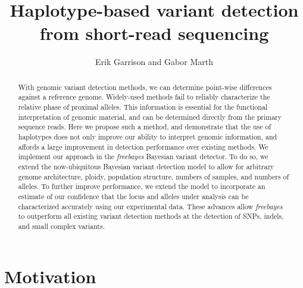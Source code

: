 \documentclass{article}
\begin{document}
\large

\title{Haplotype-based variant detection from short-read sequencing}

\author{Erik Garrison and Gabor Marth}

\maketitle


\begin{abstract}

With genomic variant detection methods, we can determine point-wise differences against a reference genome.  Widely-used methods fail to reliably characterize the relative phase of proximal alleles.  This information is essential for the functional interpretation of genomic material, and can be determined directly from the primary sequence reads.  Here we propose such a method, and demonstrate that the use of haplotypes does not only improve our ability to interpret genomic information, and affords a large improvement in detection performance over existing methods.  We implement our approach in the \emph{freebayes} Bayesian variant detector.  To do so, we extend the now-ubiquitous Bayesian variant detection model to allow for arbitrary genome architecture, ploidy, population structure, numbers of samples, and numbers of alleles.  To further improve performance, we extend the model to incorporate an estimate of our confidence that the locus and alleles under analysis can be characterized accurately using our experimental data.  These advances allow \emph{freebayes} to outperform all existing variant detection methods at the detection of SNPs, indels, and small complex variants.


\end{abstract}



\section{Motivation}
\end{document}
